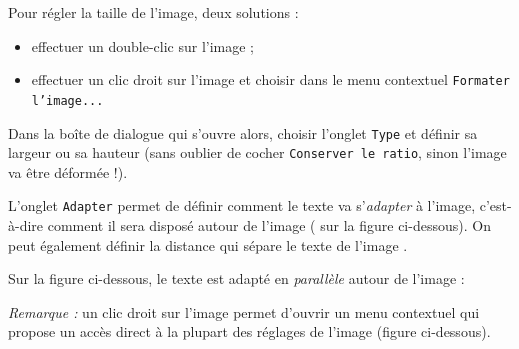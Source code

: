 Pour régler la taille de l'image, deux solutions :
\begin{itemize}
\item effectuer un double-clic sur l'image ;
\item effectuer un clic droit sur l'image et choisir dans le menu contextuel \texttt{Formater l'image...}  
\end{itemize}

Dans la boîte de dialogue qui s'ouvre alors, choisir l'onglet \texttt{Type} et définir sa largeur ou sa hauteur (sans oublier de cocher \texttt{Conserver le ratio}, sinon l'image va être déformée !). 


L'onglet \texttt{Adapter} permet de définir comment le texte va s'\emph{adapter} à l'image, c'est-à-dire comment il sera disposé autour de l'image ( sur la figure ci-dessous). On peut également définir la distance qui sépare le texte de l'image .  


Sur la figure ci-dessous, le texte est adapté en \emph{parallèle} autour de l'image : 






\emph{Remarque :} un clic droit sur l'image permet d'ouvrir un menu contextuel qui propose un accès direct à la plupart des réglages de l'image (figure ci-dessous). 







